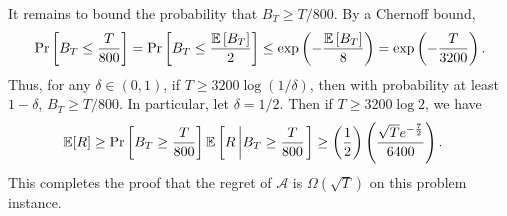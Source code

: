 It remains to bound the probability that $B_T \geq T/800$. By a Chernoff bound,
\[
  \Pr\left[B_T \le \frac{T}{800}\right] = \Pr\left[B_T \le \frac{\mathbb{E}\left[B_T\right]}{2}\right] \le
  \exp\left(-\frac{\mathbb{E}\left[B_T\right]}{8}\right) = \exp\left(-\frac{T}{3200}\right).
\]
Thus, for any $\delta \in (0,1)$, if $T \ge 3200 \log(1/\delta)$, then with probability at least $1-\delta$, $B_T \ge
T/800$.  In particular, let $\delta = 1/2$.  Then if
$T \geq 3200 \log 2$, we have
\begin{align*}
\operatorname{\mathbb{E}}[R]
&\geq
\Pr\left[B_T \geq \frac{T}{800} \right]
\operatorname{\mathbb{E}}\left[R \left\vert B_T \geq \frac{T}{800}\right. \right]
\geq \left(\frac{1}{2}\right) \left(\frac{\sqrt T e^{-\frac{7}{2}}}{6400}\right).
\end{align*}
This completes the proof that the regret of $\mathcal{A}$ is
$\Omega(\sqrt{T})$ on this problem instance.

